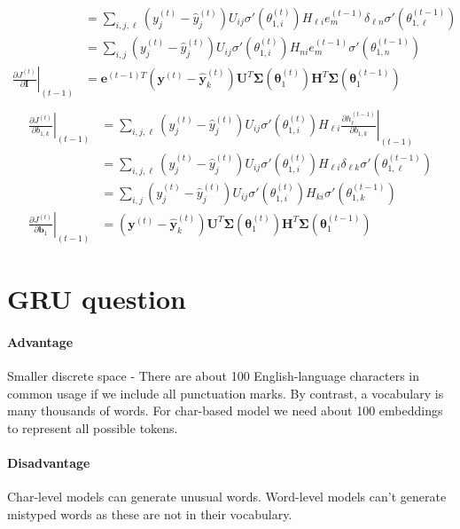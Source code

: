 \documentclass{article}
\begin{document}
\begin{itemize}
\begin{align*}
        &= \sum_{i,j,\ell} (y^{(t)}_j - \hat{y}^{(t)}_j) U_{ij} \sigma'(\theta_{1, i}^{(t)}) H_{\ell i} e^{(t-1)}_m \delta_{\ell n} \sigma'(\theta^{(t-1)}_{1, \ell}) \\
        &= \sum_{i,j} (y^{(t)}_j - \hat{y}^{(t)}_j) U_{ij} \sigma'(\theta_{1, i}^{(t)}) H_{n i} e^{(t-1)}_m \sigma'(\theta^{(t-1)}_{1, n}) \\
        \left. \frac{\partial J^{(t)}}{\partial \mathbf{I}} \right|_{(t-1)} &= \mathbf{e}^{(t-1) T} (\mathbf{y}^{(t)}-\hat{\mathbf{y}}^{(t)}_k) \mathbf{U}^T \boldsymbol{\Sigma}(\boldsymbol{\theta}_1^{(t)}) \mathbf{H}^T \boldsymbol{\Sigma}(\boldsymbol{\theta}_1^{(t-1)}) \\
    \end{align*}
    \begin{align*}
        \left. \frac{\partial J^{(t)}}{\partial b_{1,k}} \right|_{(t-1)} &= \sum_{i,j,\ell} (y^{(t)}_j - \hat{y}^{(t)}_j) U_{ij} \sigma'(\theta_{1, i}^{(t)}) H_{\ell i} \left.\frac{\partial h^{(t-1)}_\ell}{\partial b_{1,k}}\right|_{(t-1)} \\
        &= \sum_{i,j,\ell} (y^{(t)}_j - \hat{y}^{(t)}_j) U_{ij} \sigma'(\theta_{1, i}^{(t)}) H_{\ell i} \delta_{\ell k}\sigma'(\theta_{1, \ell}^{(t-1)}) \\
        &= \sum_{i,j} (y^{(t)}_j - \hat{y}^{(t)}_j) U_{ij} \sigma'(\theta_{1, i}^{(t)}) H_{k i} \sigma'(\theta_{1, k}^{(t-1)}) \\
        \left. \frac{\partial J^{(t)}}{\partial \mathbf{b}_1} \right|_{(t-1)} &= (\mathbf{y}^{(t)}-\hat{\mathbf{y}}^{(t)}_k) \mathbf{U}^T \boldsymbol{\Sigma}(\boldsymbol{\theta}_1^{(t)}) \mathbf{H}^T \boldsymbol{\Sigma}(\boldsymbol{\theta}_1^{(t-1)})
    \end{align*}
\end{itemize}

\section{GRU question}
\paragraph{Advantage}
Smaller discrete space - There are about 100 English-language characters in common usage if we include all punctuation marks. By contrast, a vocabulary is many thousands of words. For char-based model we need about 100 embeddings to represent all possible tokens.

\paragraph{Disadvantage}
Char-level models can generate unusual words. Word-level models can't generate mistyped words as these are not in their vocabulary. 
\end{document}
